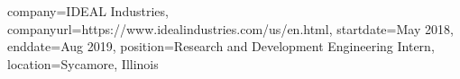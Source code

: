 \documentclass[10pt]{article}
\begin{document}
\begin{resume_sec}
    \begin{subsec}
        {
            company={IDEAL Industries},
            companyurl={https://www.idealindustries.com/us/en.html},
            startdate={May 2018},
            enddate={Aug 2019},
            position={Research and Development Engineering Intern},
            location={Sycamore, Illinois}
        }
        

\end{subsec}
\end{resume_sec}
\end{document}
